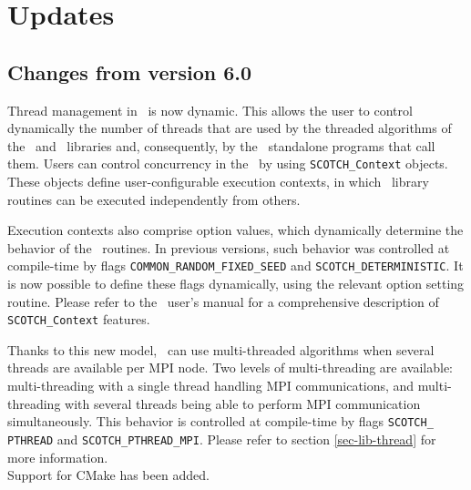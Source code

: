 
\section{Updates}
\label{sec-changes}

\subsection{Changes from version 6.0}

Thread management in \scotch\ is now dynamic. This allows the user to
control dynamically the number of threads that are used by the
threaded algorithms of the \libptscotch\ and \libscotch\ libraries
and, consequently, by the \ptscotch\ standalone programs that call
them. Users can control concurrency in the \libptscotch\ by using
\texttt{SCOTCH\_\lbt Context} objects. These objects define
user-configurable execution contexts, in which \libptscotch\ library
routines can be executed independently from others.

Execution contexts also comprise option values, which dynamically
determine the behavior of the \scotch\ routines. In previous versions,
such behavior was controlled at compile-time by flags
\texttt{COMMON\_\lbt RANDOM\_\lbt FIXED\_\lbt SEED} and
\texttt{SCOTCH\_\lbt DETERMINISTIC}. It is now possible to define
these flags dynamically, using the relevant option setting routine.
Please refer to the \scotch\ user's manual for a comprehensive
description of \texttt{SCOTCH\_\lbt Context} features.

Thanks to this new model, \ptscotch\ can use multi-threaded
algorithms when several threads are available per MPI node. Two
levels of multi-threading are available: multi-threading with a single
thread handling MPI communications, and multi-threading with several
threads being able to perform MPI communication simultaneously. This
behavior is controlled at compile-time by flags \texttt{SCOTCH\_\lbt
PTHREAD} and \texttt{SCOTCH\_\lbt PTHREAD\_\lbt MPI}.
Please refer to section \ref{sec-lib-thread} for more information.
\\

Support for CMake has been added.

